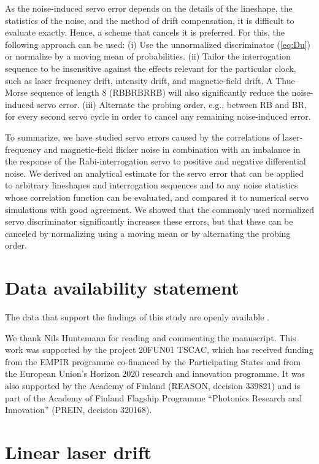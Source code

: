 \documentclass[10pt,a4paper]{iopart}
\newcommand{\eqref}[1]{(\ref{#1})}
\begin{document}
As the noise-induced servo error depends on the details of the lineshape, the statistics of the noise, and the method of drift compensation, it is difficult to evaluate exactly. Hence, a scheme that cancels it is preferred. For this, the following approach can be used: (i) Use the unnormalized discriminator \eqref{eq:Du} or normalize by a moving mean of probabilities.
(ii) Tailor the interrogation sequence to be insensitive against the effects relevant for the particular clock, such as laser frequency drift, intensity drift, and magnetic-field drift. A Thue--Morse sequence of length 8 (RBBRBRRB) will also significantly reduce the noise-induced servo error. (iii) Alternate the probing order, e.g., between RB and BR, for every second servo cycle in order to cancel any remaining noise-induced error.

To summarize, we have studied servo errors caused by the correlations of laser-frequency and magnetic-field flicker noise in combination with an imbalance in the response of the Rabi-interrogation servo to positive and negative differential noise. We derived an analytical estimate for the servo error that can be applied to arbitrary lineshapes and interrogation sequences and to any noise statistics whose correlation function can be evaluated, and compared it to numerical servo simulations with good agreement.  We showed that the commonly used normalized servo discriminator significantly increases these errors, but that these can be canceled by normalizing using a moving mean or by alternating the probing order.

\section*{Data availability statement}

The data that support the findings of this study are openly available \cite{data}.

\ack

We thank Nils Huntemann for reading and commenting the manuscript.
This work was supported by the project 20FUN01 TSCAC, which has received funding from the EMPIR programme co-financed by the Participating States and from the European Union’s Horizon 2020 research and innovation programme.
It was also supported by the Academy of Finland (REASON, decision 339821) and is part of
the Academy of Finland Flagship Programme “Photonics Research and Innovation” (PREIN, decision 320168).


\appendix

\section{Linear laser drift \label{sec:drift}}
\end{document}
